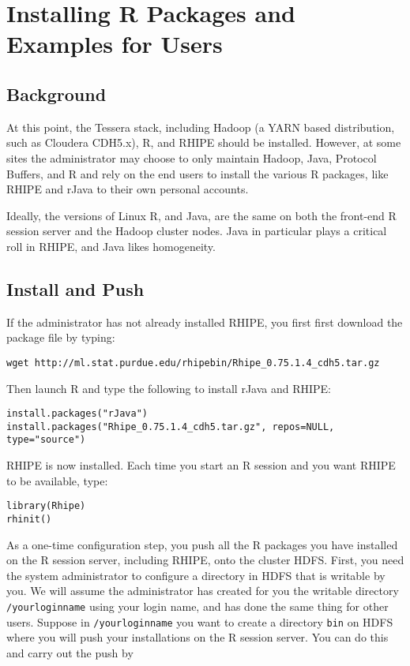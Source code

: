 \section{Installing R Packages and Examples for Users}
\subsection{Background}

At this point, the Tessera stack, including Hadoop (a YARN based
distribution, such as Cloudera CDH5.x), R, and RHIPE should be installed.
However, at some sites the administrator may choose to only maintain
Hadoop, Java, Protocol Buffers, and R and rely on the end users to
install the various R packages, like RHIPE and rJava to their own
personal accounts.

Ideally, the versions of Linux R, and Java, are the same on both the
front-end R session server and the Hadoop cluster nodes.  Java in particular
plays a critical roll in RHIPE, and Java likes homogeneity.

\subsection{Install and Push}
If the administrator has not already installed RHIPE, you first
first download the package file by typing:

\begin{verbatim}
wget http://ml.stat.purdue.edu/rhipebin/Rhipe_0.75.1.4_cdh5.tar.gz
\end{verbatim}

Then launch R and type the following to install rJava and RHIPE:

\begin{verbatim}
install.packages("rJava")
install.packages("Rhipe_0.75.1.4_cdh5.tar.gz", repos=NULL, type="source")
\end{verbatim}

RHIPE is now installed. Each time you start an R session and you
want RHIPE to be available, type:

\begin{verbatim}
library(Rhipe)
rhinit()
\end{verbatim}

As a one-time configuration step, you push all the R packages you have
installed on the R session server, including RHIPE, onto the cluster HDFS.
First, you need the system administrator to configure a directory in HDFS
that is writable by you. We will assume the administrator has created
for you the writable directory \texttt{/yourloginname} using your
login name, and has done the same thing for other users.  Suppose in
\texttt{/yourloginname} you want to create a directory \texttt{bin}
on HDFS where you will push your installations on the R session
server. You can do this and carry out the push by

